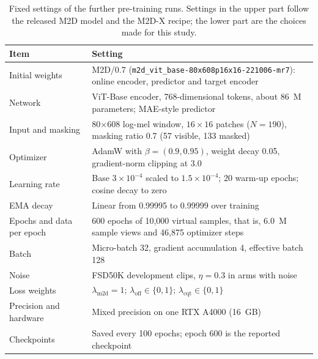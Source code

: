 \documentclass{FastFyp}
\begin{document}
\begin{table}[htbp]
\centering
\caption[Fixed settings of the further pre-training runs]{Fixed settings of the further pre-training runs. Settings in the upper part follow the released M2D model and the M2D-X recipe; the lower part are the choices made for this study.}
\label{tab:m5-hparams}
\small\singlespacing
\begin{tabularx}{\linewidth}{>{\raggedright\arraybackslash}p{4.0cm}Y}
\toprule
\textbf{Item} & \textbf{Setting}\\
\midrule
Initial weights & M2D/0.7 (\texttt{m2d\_vit\_base-80x608p16x16-221006-mr7}): online encoder, predictor and target encoder\\
Network & ViT-Base encoder, 768-dimensional tokens, about 86~M parameters; MAE-style predictor\\
Input and masking & 80$\times$608 log-mel window, $16\times16$ patches ($N=190$), masking ratio 0.7 (57 visible, 133 masked)\\
Optimizer & AdamW with $\beta=(0.9,0.95)$, weight decay 0.05, gradient-norm clipping at 3.0\\
Learning rate & Base $3\times10^{-4}$ scaled to $1.5\times10^{-4}$; 20 warm-up epochs; cosine decay to zero\\
EMA decay & Linear from 0.99995 to 0.99999 over training\\
\midrule
Epochs and data per epoch & 600 epochs of 10,000 virtual samples, that is, 6.0~M sample views and 46,875 optimizer steps\\
Batch & Micro-batch 32, gradient accumulation 4, effective batch 128\\
Noise & FSD50K development clips, $\eta=0.3$ in arms with noise\\
Loss weights & $\lambda_{\mathrm{m2d}}=1$; $\lambda_{\mathrm{off}}\in\{0,1\}$; $\lambda_{\mathrm{cqt}}\in\{0,1\}$\\
Precision and hardware & Mixed precision on one RTX A4000 (16~GB)\\
Checkpoints & Saved every 100 epochs; epoch 600 is the reported checkpoint\\
\bottomrule
\end{tabularx}
\end{table}
\end{document}
